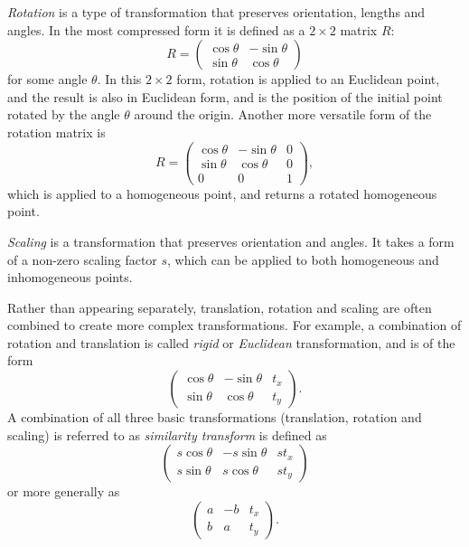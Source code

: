 \documentclass[11pt, oneside, reqno]{book}
\begin{document}
\begin{definition}%
	\label{def:rotation}
	\textit{Rotation} is a type of transformation that preserves orientation, lengths and angles. In the most compressed form it is defined as a $ 2\times 2 $ matrix $R$:
	\[ 
	R = \begin{pmatrix}
	\cos\theta & -\sin\theta \\
	\sin\theta & \cos\theta
	\end{pmatrix} 
	\]
	for some angle $\theta$. In this $2\times 2$ form, rotation is applied to an Euclidean point, and the result is also in Euclidean form, and is the position of the initial point rotated by the angle $\theta$ around the origin. Another more versatile form of the rotation matrix is
	\[
	R = \begin{pmatrix}
	\cos\theta & -\sin\theta & 0 \\
	\sin\theta & \cos\theta  & 0 \\
	0 & 0 & 1
	\end{pmatrix} ,
	\]
	which is applied to a homogeneous point, and returns a rotated homogeneous point.
\end{definition}


\begin{definition}%
	\label{def:scaling}
	\textit{Scaling} is a transformation that preserves orientation and angles. It takes a form of a non-zero scaling factor $s$, which can be applied to both homogeneous and inhomogeneous points.
\end{definition}

Rather than appearing separately, translation, rotation and scaling are often combined to create more complex transformations. For example, a combination of rotation and translation is called \textit{rigid} or \textit{Euclidean} transformation, and is of the form
\[
\begin{pmatrix}
\cos\theta & -\sin\theta & t_x \\
\sin\theta & \cos\theta  & t_y
\end{pmatrix}.
\]
A combination of all three basic transformations (translation, rotation and scaling) is referred to as \textit{similarity transform} is defined as
\[
\begin{pmatrix}
s\cos\theta & -s\sin\theta & st_x \\
s\sin\theta & s\cos\theta  & st_y
\end{pmatrix}
\]
or more generally as
\[
\begin{pmatrix}
a & -b & t_x \\
b & a  & t_y
\end{pmatrix}.
\]
\end{document}
